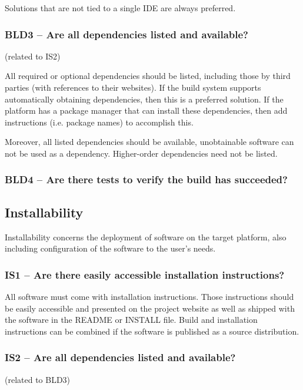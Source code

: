 \documentclass[a4paper,11pt]{article}
\begin{document}
Solutions that are not tied to a single IDE are always preferred.

\subsubsection{BLD3 -- Are all dependencies listed and available?}
(related to IS2)

All required or optional dependencies should be listed, including those by
third parties (with references to their websites). If the build system supports
automatically obtaining dependencies, then this is a preferred solution. If the
platform has a package manager that can install these dependencies, then add
instructions (i.e. package names) to accomplish this.

Moreover, all listed dependencies should be available, unobtainable software
can not be used as a dependency. Higher-order dependencies need not be listed.

\subsubsection{BLD4 -- Are there tests to verify the build has succeeded?}


\subsection{Installability}

Installability concerns the deployment of software on the target platform, also
including configuration of the software to the user's needs.

\subsubsection{IS1 -- Are there easily accessible installation instructions?}

All software must come with installation instructions. Those instructions should
be easily accessible and presented on the project website as well as shipped
with the software in the README or INSTALL file. Build and installation
instructions can be combined if the software is published as a source
distribution.

\subsubsection{IS2 -- Are all dependencies listed and available?}
(related to BLD3)
\end{document}
